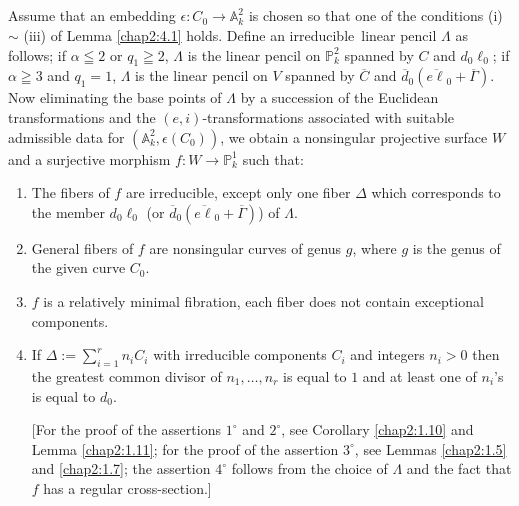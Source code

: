 \subsection{}\label{chap2:4.3}
Assume that an embedding $\epsilon:C_{0}\to \mathbb{A}^{2}_{k}$ is
chosen so that one of the conditions (i) $\sim$ (iii) of Lemma
\ref{chap2:4.1} holds. Define an irreducible\pageoriginale\ linear pencil
$\Lambda$ as follows; if $\alpha\leqq 2$ or $q_{1}\geqq 2$, $\Lambda$
is the linear pencil on $\mathbb{P}^{2}_{k}$ spanned by $C$ and
$d_{0}\ell_{0}$; if $\alpha\geqq 3$ and $q_{1}=1$, $\Lambda$ is the
linear pencil on $V$ spanned by $\overline{C}$ and
$\overline{d}_{0}(\overline{e\ell}_{0}+\overline{\Gamma})$. Now
eliminating the base points of $\Lambda$ by a succession of the
Euclidean transformations and the $(e,i)$-transformations associated
with suitable admissible data for
$(\mathbb{A}^{2}_{k},\epsilon(C_{0}))$, we obtain a nonsingular
projective surface $W$ and a surjective morphism $f:W\to
\mathbb{P}^{1}_{k}$ such that:
\begin{enumerate}
\renewcommand{\labelenumi}{\theenumi$^{\circ}$}
\item The fibers of $f$ are irreducible, except only one fiber
  $\Delta$ which corresponds to the member $d_{0}\ell_{0}$ (or
  $\overline{d}_{0}(\overline{e\ell}_{0}+\overline{\Gamma})$) of
  $\Lambda$.

\item General fibers of $f$ are nonsingular curves of genus $g$, where
  $g$ is the genus of the given curve $C_{0}$.

\item $f$ is a relatively minimal fibration, \iec each fiber does not
  contain exceptional components.

\item If $\Delta:={\displaystyle{\mathop{\sum}^{r}_{i=1}}}n_{i}C_{i}$
  with irreducible components $C_{i}$ and integers $n_{i}>0$ then the
  greatest common divisor of $n_{1},\ldots,n_{r}$ is equal to $1$ and
  at least one of $n_{i}$'s is equal to $d_{0}$.

[For the proof of the assertions $1^{\circ}$ and $2^{\circ}$, see
  Corollary \ref{chap2:1.10} and Lemma \ref{chap2:1.11}; for the proof of
  the assertion $3^{\circ}$, see Lemmas \ref{chap2:1.5} and \ref{chap2:1.7};
  the assertion $4^{\circ}$ follows from the choice of $\Lambda$ and
  the fact that $f$ has a regular cross-section.] 
\end{enumerate}

